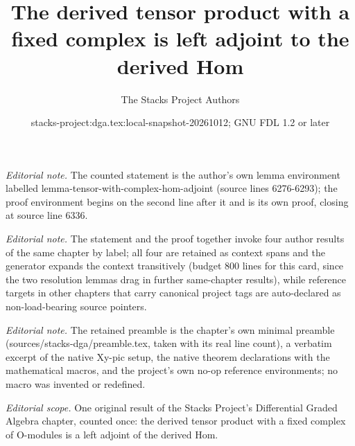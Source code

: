 \documentclass{stacks-project}
\title{The derived tensor product with a fixed complex is left adjoint to the derived Hom}
\author{The Stacks Project Authors}
\date{stacks-project:dga.tex:local-snapshot-20261012; GNU FDL 1.2 or later}
\theoremstyle{plain}
\theoremstyle{definition}
\theoremstyle{remark}
\numberwithin{equation}{subsection}
\begin{document}
\maketitle
\noindent\textit{Editorial note.} The counted statement is the author's own lemma environment labelled lemma-tensor-with-complex-hom-adjoint (source lines 6276-6293); the proof environment begins on the second line after it and is its own proof, closing at source line 6336.\par\medskip
\noindent\textit{Editorial note.} The statement and the proof together invoke four author results of the same chapter by label; all four are retained as context spans and the generator expands the context transitively (budget 800 lines for this card, since the two resolution lemmas drag in further same-chapter results), while reference targets in other chapters that carry canonical project tags are auto-declared as non-load-bearing source pointers.\par\medskip
\noindent\textit{Editorial note.} The retained preamble is the chapter's own minimal preamble (sources/stacks-dga/preamble.tex, taken with its real line count), a verbatim excerpt of the native Xy-pic setup, the native theorem declarations with the mathematical macros, and the project's own no-op reference environments; no macro was invented or redefined.\par\medskip
\noindent\textit{Editorial scope.} One original result of the Stacks Project's Differential Graded Algebra chapter, counted once: the derived tensor product with a fixed complex of O-modules is a left adjoint of the derived Hom.\par\medskip
\end{document}
